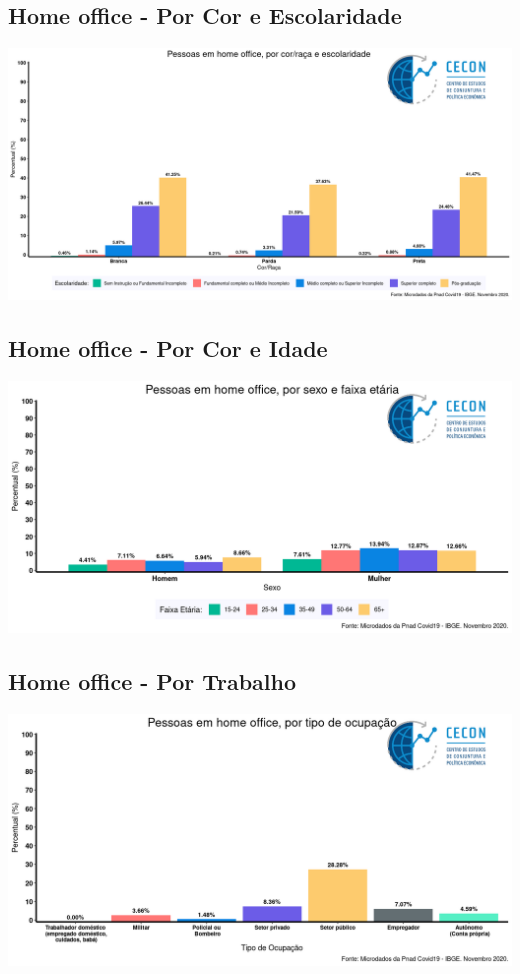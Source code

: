 \documentclass{SelfArx}
\begin{document}
\subsection*{Home office - Por Cor e Escolaridade}
\label{sec:orgf6bfd3a}
\begin{center}
\includegraphics[width=.9\linewidth]{./figs/PNAD_COVID/home_edu_cor.png}
\end{center}
\subsection*{Home office - Por Cor e Idade}
\label{sec:orgc729242}
\begin{center}
\includegraphics[width=.9\linewidth]{./figs/PNAD_COVID/home_sexo_idade.png}
\end{center}

\subsection*{Home office - Por Trabalho}
\label{sec:org83a37bb}
\begin{center}
\includegraphics[width=.9\linewidth]{./figs/PNAD_COVID/home_emprego.png}
\end{center}
\end{document}
